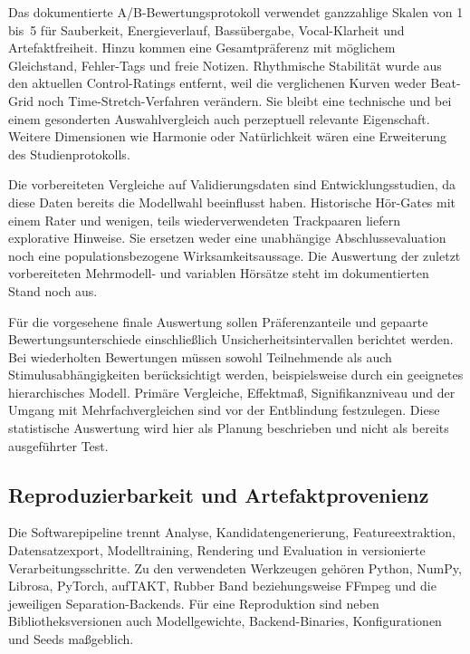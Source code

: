 Das dokumentierte A/B-Bewertungsprotokoll verwendet ganzzahlige Skalen von 1 bis~5 für Sauberkeit, Energieverlauf, Bassübergabe, Vocal-Klarheit und Artefaktfreiheit. Hinzu kommen eine Gesamtpräferenz mit möglichem Gleichstand, Fehler-Tags und freie Notizen. Rhythmische Stabilität wurde aus den aktuellen Control-Ratings entfernt, weil die verglichenen Kurven weder Beat-Grid noch Time-Stretch-Verfahren verändern. Sie bleibt eine technische und bei einem gesonderten Auswahlvergleich auch perzeptuell relevante Eigenschaft. Weitere Dimensionen wie Harmonie oder Natürlichkeit wären eine Erweiterung des Studienprotokolls.

Die vorbereiteten Vergleiche auf Validierungsdaten sind Entwicklungsstudien, da diese Daten bereits die Modellwahl beeinflusst haben. Historische Hör-Gates mit einem Rater und wenigen, teils wiederverwendeten Trackpaaren liefern explorative Hinweise. Sie ersetzen weder eine unabhängige Abschlussevaluation noch eine populationsbezogene Wirksamkeitsaussage. Die Auswertung der zuletzt vorbereiteten Mehrmodell- und variablen Hörsätze steht im dokumentierten Stand noch aus.


Für die vorgesehene finale Auswertung sollen Präferenzanteile und gepaarte Bewertungsunterschiede einschließlich Unsicherheitsintervallen berichtet werden. Bei wiederholten Bewertungen müssen sowohl Teilnehmende als auch Stimulusabhängigkeiten berücksichtigt werden, beispielsweise durch ein geeignetes hierarchisches Modell. Primäre Vergleiche, Effektmaß, Signifikanzniveau und der Umgang mit Mehrfachvergleichen sind vor der Entblindung festzulegen. Diese statistische Auswertung wird hier als Planung beschrieben und nicht als bereits ausgeführter Test.

\subsection{Reproduzierbarkeit und Artefaktprovenienz}
\label{sec:methodik-reproduzierbarkeit}

Die Softwarepipeline trennt Analyse, Kandidatengenerierung, Featureextraktion, Datensatzexport, Modelltraining, Rendering und Evaluation in versionierte Verarbeitungsschritte. Zu den verwendeten Werkzeugen gehören Python, NumPy, Librosa, PyTorch, aufTAKT, Rubber Band beziehungsweise FFmpeg und die jeweiligen Separation-Backends. Für eine Reproduktion sind neben Bibliotheksversionen auch Modellgewichte, Backend-Binaries, Konfigurationen und Seeds maßgeblich.

